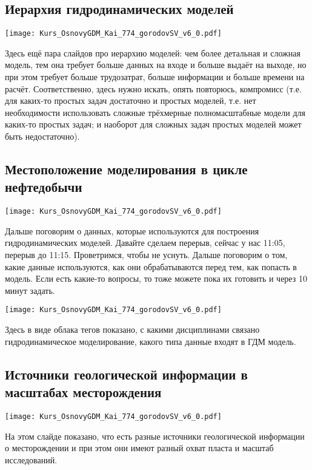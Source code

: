 \documentclass[main.tex]{subfiles}
\begin{document}
\subsection{Иерархия гидродинамических моделей}

\texttt{[image: Kurs\_OsnovyGDM\_Kai\_774\_gorodovSV\_v6\_0.pdf]}

Здесь ещё пара слайдов про иерархию моделей: чем более детальная и сложная модель, тем она требует больше данных на входе и больше выдаёт на выходе, но при этом требует больше трудозатрат, больше информации и больше времени на расчёт.
Соответственно, здесь нужно искать, опять повторюсь, компромисс (т.е. для каких-то простых задач достаточно и простых моделей, т.е. нет необходимости использовать сложные трёхмерные полномасштабные модели для каких-то простых задач; и наоборот для сложных задач простых моделей может быть недостаточно).

\subsection{Местоположение моделирования в цикле нефтедобычи}

\texttt{[image: Kurs\_OsnovyGDM\_Kai\_774\_gorodovSV\_v6\_0.pdf]}

Дальше поговорим о данных, которые используются для построения гидродинамических моделей.
Давайте сделаем перерыв, сейчас у нас 11:05, перерыв до 11:15.
Проветримся, чтобы не уснуть.
Дальше поговорим о том, какие данные используются, как они обрабатываются перед тем, как попасть в модель.
Если есть какие-то вопросы, то тоже можете пока их готовить и через 10 минут задать.

\texttt{[image: Kurs\_OsnovyGDM\_Kai\_774\_gorodovSV\_v6\_0.pdf]}

Здесь в виде облака тегов показано, с какими дисциплинами связано гидродинамическое моделирование, какого типа данные входят в ГДМ модель.

\subsection{Источники геологической информации в масштабах месторождения}

\texttt{[image: Kurs\_OsnovyGDM\_Kai\_774\_gorodovSV\_v6\_0.pdf]}

На этом слайде показано, что есть разные источники геологической информации о месторождении и при этом они имеют разный охват пласта и масштаб исследований.
\end{document}
